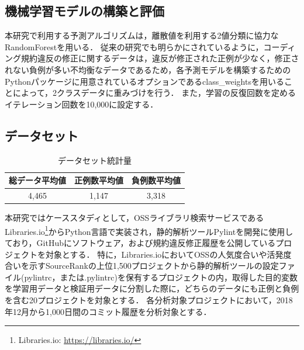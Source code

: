 \documentclass[paper]{ieicej}
\begin{document}
\subsection{機械学習モデルの構築と評価}

本研究で利用する予測アルゴリズムは，離散値を利用する2値分類に協力なRandomForestを用いる．
従来の研究でも明らかにされているように，コーディング規約違反の修正に関するデータは，違反が修正された正例が少なく，修正されない負例が多い不均衡なデータであるため，各予測モデルを構築するためのPythonパッケージに用意されているオプションであるclass\_weightsを用いることによって，2クラスデータに重みづけを行う．
また，学習の反復回数を定めるイテレーション回数を10,000に設定する．


\subsection{データセット}


\begin{table}[t]
    \centering
    \caption{データセット統計量}
    \label{tab:dataset_statistics}
    \begin{tabular}{ccc}
        \toprule
        総データ平均値 & 正例数平均値 & 負例数平均値 \\
        \midrule
        4,465 & 1,147 & 3,318 \\
        \bottomrule
    \end{tabular}
\end{table}


本研究ではケーススタディとして，OSSライブラリ検索サービスであるLibraries.io\footnote{Libraries.io: \url{https://libraries.io/}}からPython言語で実装され，静的解析ツールPylintを開発に使用しており，GitHubにソフトウェア，および規約違反修正履歴を公開しているプロジェクトを対象とする．
特に，Libraries.ioにおいてOSSの人気度合いや活発度合いを示すSourceRankの上位1,500プロジェクトから静的解析ツールの設定ファイル(pylintrc，または.pylintrc)を保有するプロジェクトの内，取得した目的変数を学習用データと検証用データに分割した際に，どちらのデータにも正例と負例を含む20プロジェクトを対象とする．
各分析対象プロジェクトにおいて，2018年12月から1,000日間のコミット履歴を分析対象とする．
\end{document}
